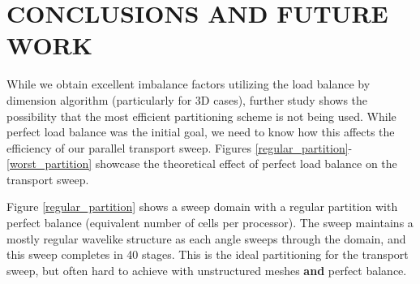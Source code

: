 \documentclass[letterpaper]{mandc2019}
\begin{document}
\section{CONCLUSIONS AND FUTURE WORK}

While we obtain excellent imbalance factors utilizing the load balance by dimension algorithm (particularly for 3D cases), further study shows the possibility that the most efficient partitioning scheme is not being used. 
While perfect load balance was the initial goal, we need to know how this affects the efficiency of our parallel transport sweep. Figures \ref{regular_partition}-\ref{worst_partition} showcase the theoretical effect of perfect load balance on the transport sweep.

Figure \ref{regular_partition} shows a sweep domain with a regular partition with perfect balance (equivalent number of cells per processor). The sweep maintains a mostly regular wavelike structure as each angle sweeps through the domain, and this sweep completes in 40 stages. This is the ideal partitioning for the transport sweep, but often hard to achieve with unstructured meshes \textbf{and} perfect balance.
\end{document}
